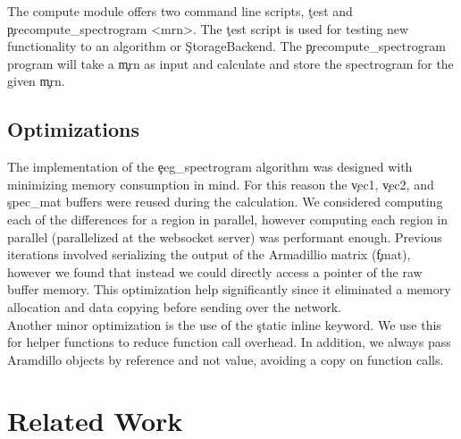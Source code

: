 The compute module offers two command line scripts, \c{test} and
\c{precompute\_spectrogram <mrn>}. The \c{test} script is used for testing new
functionality to an algorithm or \c{StorageBackend}. The
\c{precompute\_spectrogram} program will take a \c{mrn} as input and calculate
and store the spectrogram for the given \c{mrn}.

\subsection{Optimizations}

The implementation of the \c{eeg\_spectrogram} algorithm was designed with
minimizing memory consumption in mind. For this reason the \c{vec1}, \c{vec2},
and \c{spec\_mat} buffers were reused during the calculation. We considered
computing each of the differences for a region in parallel, however computing
each region in parallel (parallelized at the websocket server) was performant
enough. Previous iterations involved serializing the output of the Armadillio
matrix (\c{fmat}), however we found that instead we could directly access a
pointer of the raw buffer memory. This optimization help significantly since it
eliminated a memory allocation and data copying before sending over the
network. \\

Another minor optimization is the use of the \c{static inline} keyword. We use
this for helper functions to reduce function call overhead. In addition, we
always pass Aramdillo objects by reference and not value, avoiding a copy on
function calls.

\section{Related Work}

